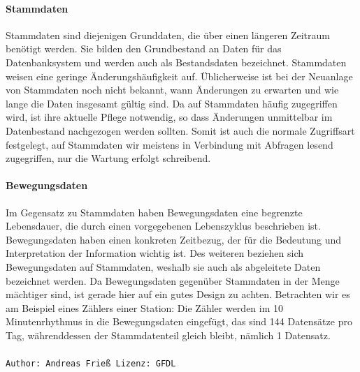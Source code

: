 \paragraph{Stammdaten}
Stammdaten sind diejenigen Grunddaten, die über einen längeren Zeitraum benötigt werden. Sie bilden den Grundbestand an Daten für das Datenbanksystem und werden auch als Bestandsdaten bezeichnet. Stammdaten weisen eine geringe Änderungshäufigkeit auf. Üblicherweise ist bei der Neuanlage von Stammdaten noch nicht bekannt, wann Änderungen zu erwarten und wie lange die Daten insgesamt gültig sind. Da auf Stammdaten häufig zugegriffen wird, ist ihre aktuelle Pflege notwendig, so dass Änderungen unmittelbar im Datenbestand nachgezogen werden sollten. Somit ist auch die normale Zugriffsart festgelegt, auf Stammdaten wir meistens in Verbindung mit Abfragen lesend zugegriffen, nur die Wartung erfolgt schreibend.

\paragraph{Bewegungsdaten}
Im Gegensatz zu Stammdaten haben Bewegungsdaten eine begrenzte Lebensdauer, die durch einen vorgegebenen Lebenszyklus beschrieben ist. Bewegungsdaten haben einen konkreten Zeitbezug, der für die Bedeutung und Interpretation der Information wichtig ist. Des weiteren beziehen sich Bewegungsdaten auf Stammdaten, weshalb sie auch als abgeleitete Daten bezeichnet werden. Da Bewegungsdaten gegenüber Stammdaten in der Menge mächtiger sind, ist gerade hier auf ein gutes Design zu achten. Betrachten wir es am Beispiel eines Zählers einer Station: Die Zähler werden im 10 Minutenrhythmus in die Bewegungsdaten eingefügt, das sind 144 Datensätze pro Tag, währenddessen der Stammdatenteil gleich bleibt, nämlich 1 Datensatz.
\\
\\
\verb|Author: Andreas Frieß Lizenz: GFDL |